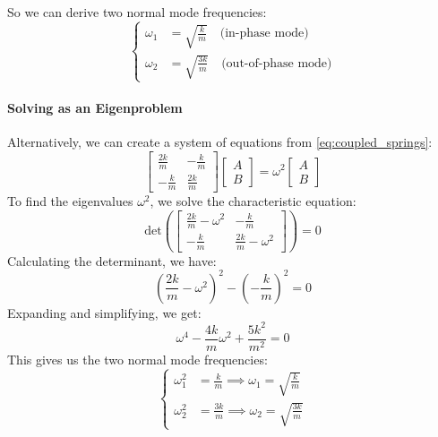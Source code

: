\documentclass[11pt]{report}
\begin{document}
So we can derive two normal mode frequencies:
$$
    \begin{cases}
        \omega_1 &= \sqrt{\frac{k}{m}} \quad \text{(in-phase mode)} \\
        \omega_2 &= \sqrt{\frac{3k}{m}} \quad \text{(out-of-phase mode)}
    \end{cases}
$$

\paragraph{Solving as an Eigenproblem} Alternatively, we can create a system of equations from \eqref{eq:coupled_springs}:
$$
    \begin{bmatrix}
        \frac{2k}{m} & -\frac{k}{m} \\
        -\frac{k}{m} & \frac{2k}{m}
    \end{bmatrix}
    \begin{bmatrix}
        A \\ B
    \end{bmatrix}
    = \omega^2
    \begin{bmatrix}
        A \\ B
    \end{bmatrix}
$$
To find the eigenvalues \( \omega^2 \), we solve the characteristic equation:
$$
    \text{det}\left(\begin{bmatrix}
        \frac{2k}{m} - \omega^2 & -\frac{k}{m} \\
        -\frac{k}{m} & \frac{2k}{m} - \omega^2
    \end{bmatrix}\right) = 0
$$
Calculating the determinant, we have:
$$
    \left(\frac{2k}{m} - \omega^2\right)^2 - \left(-\frac{k}{m}\right)^2 = 0
$$
Expanding and simplifying, we get:
$$
    \omega^4 - \frac{4k}{m}\omega^2 + \frac{5k^2}{m^2} = 0
$$
This gives us the two normal mode frequencies:
$$
    \begin{cases}
        \omega_1^2 &= \frac{k}{m} \implies \omega_1 = \sqrt{\frac{k}{m}} \\
        \omega_2^2 &= \frac{3k}{m} \implies \omega_2 = \sqrt{\frac{3k}{m}}
    \end{cases}
$$
\end{document}
